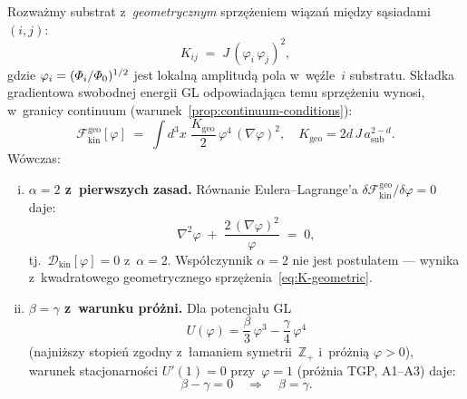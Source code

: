 \begin{proposition}[Substrat z~geometrycznym sprz\k{e}\.zeniem;
  $\alpha = 2$ i~$\beta = \gamma$]%
\label{prop:substrate-action}
Rozwa\.zmy substrat z~\emph{geometrycznym} sprz\k{e}\.zeniem
wi\k{a}za\'n mi\k{e}dzy s\k{a}siadami $(i,j)$:
\begin{equation}\label{eq:K-geometric}
  K_{ij} \;=\; J\,(\varphi_i\,\varphi_j)^2,
\end{equation}
gdzie $\varphi_i = (\varPhi_i/\varPhi_0)^{1/2}$ jest lokaln\k{a}
amplitud\k{a} pola w~w\k{e}\'zle~$i$ substratu.
Sk\l{}adka gradientowa swobodnej energii GL odpowiadaj\k{a}ca
temu sprz\k{e}\.zeniu wynosi, w~granicy continuum
(warunek~\ref{prop:continuum-conditions}):
\begin{equation}\label{eq:Lkin-geo}
  \boxed{
    \mathcal{F}_{\mathrm{kin}}^{\mathrm{geo}}[\varphi]
    \;=\; \int d^3x\;\frac{K_{\mathrm{geo}}}{2}\,
          \varphi^4\,(\nabla\varphi)^2,
    \quad
    K_{\mathrm{geo}} = 2d\,J\,a_{\mathrm{sub}}^{2-d}.
  }
\end{equation}
W\'owczas:
\begin{enumerate}[(i)]
  \item \textbf{$\alpha = 2$ z~pierwszych zasad.}
    R\'ownanie Eulera--Lagrange'a
    $\delta\mathcal{F}_{\mathrm{kin}}^{\mathrm{geo}}/\delta\varphi = 0$
    daje:
    \begin{equation}\label{eq:EL-alpha2}
      \nabla^2\varphi \;+\;
        \frac{2\,(\nabla\varphi)^2}{\varphi} \;=\; 0,
    \end{equation}
    tj.\ $\mathcal{D}_{\mathrm{kin}}[\varphi] = 0$ z~$\alpha = 2$.
    Wsp\'o\l{}czynnik $\alpha = 2$ nie jest postulatem
    --- wynika z~kwadratowego geometrycznego sprz\k{e}\.zenia~\eqref{eq:K-geometric}.

  \item \textbf{$\beta = \gamma$ z~warunku pr\'o\.zni.}
    Dla potencja\l{}u GL
    \begin{equation}\label{eq:U-GL}
      U(\varphi) = \frac{\beta}{3}\,\varphi^3 - \frac{\gamma}{4}\,\varphi^4
    \end{equation}
    (najni\.zszy stopie\'n zgodny z~\l{}amaniem symetrii~$\mathbb{Z}_+$
    i~pr\'o\.zni\k{a} $\varphi > 0$),
    warunek stacjonarno\'sci $U'(1) = 0$ przy~$\varphi = 1$
    (pr\'o\.znia TGP, A1--A3) daje:
    \begin{equation}\label{eq:beta-eq-gamma}
      \beta - \gamma = 0
      \quad\Longrightarrow\quad
      \boxed{\beta = \gamma.}
    \end{equation}


\end{enumerate}
\end{proposition}
